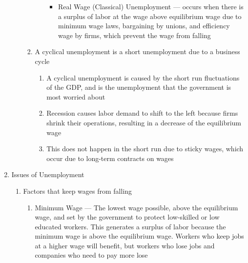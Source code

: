\documentclass[12pt]{article}
\begin{document}
\begin{enumerate}
\begin{enumerate}
\begin{enumerate}
\begin{enumerate}
\begin{itemize}
                      \item Real Wage (Classical) Unemployment — occurs when there is a surplus of labor at the wage above equilibrium wage due to minimum wage laws, bargaining by unions, and efficiency wage by firms, which prevent the wage from falling

                    \end{itemize}

                \end{enumerate}

              \item A cyclical unemployment is a short unemployment due to a business cycle

                \begin{enumerate}

                  \item A cyclical unemployment is caused by the short run fluctuations of the GDP, and is the unemployment that the government is most worried about

                  \item Recession causes labor demand to shift to the left because firms shrink their operations, resulting in a decrease of the equilibrium wage

                  \item This does not happen in the short run due to sticky wages, which occur due to long-term contracts on wages

                \end{enumerate}

            \end{enumerate}

        \end{enumerate}

      \item Issues of Unemployment

        \begin{enumerate}

          \item Factors that keep wages from falling 

            \begin{enumerate}

              \item Minimum Wage — The lowest wage possible, above the equilibrium wage, and set by the government to protect low-skilled or low educated workers. This generates a surplus of labor because the minimum wage is above the equilibrium wage. Workers who keep jobs at a higher wage will benefit, but workers who lose jobs and companies who need to pay more lose


\end{enumerate}
\end{enumerate}
\end{enumerate}
\end{document}
